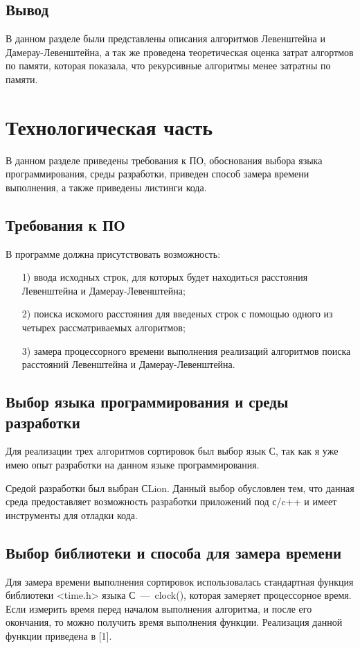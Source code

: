 \documentclass[12pt]{report}
\begin{document}
	\section*{Вывод}
	
	В данном разделе были представлены описания алгоритмов Левенштейна и Дамерау-Левенштейна, а так же проведена теоретическая оценка затрат алгортмов по памяти, которая показала, что рекурсивные алгоритмы менее затратны по памяти.
	
	\chapter{Технологическая часть}
	
	В данном разделе приведены требования к ПО, обоснования выбора языка программирования, среды разработки, приведен способ замера времени выполнения, а также приведены листинги кода.
	
	\section{Требования к ПО}
	
	В программе должна присутствовать возможность:
	
	\begin{enumerate}
		\item[1)] ввода исходных строк, для которых будет находиться расстояния Левенштейна и Дамерау-Левенштейна;
		\item[2)] поиска искомого расстояния для введеных строк с помощью одного из четырех рассматриваемых алгоритмов;
		\item[3)] замера процессорного времени выполнения реализаций алгоритмов поиска расстояний Левенштейна и Дамерау-Левенштейна.
	\end{enumerate}
	
	\section{Выбор языка программирования и среды разработки}
	
	Для реализации трех алгоритмов сортировок был выбор язык С, так как я уже имею опыт разработки на данном языке программирования.

	Средой разработки был выбран СLion. Данный выбор обусловлен тем, что данная среда предоставляет возможность разработки приложений под с/c++ и имеет инструменты для отладки кода. 
	
	\section{Выбор библиотеки и способа для замера времени}
		Для замера времени выполнения сортировок использовалась стандартная функция библиотеки <time.h> языка С~---~clock(), которая замеряет процессорное время. Если измерить время перед началом выполнения алгоритма, и после его окончания, то можно получить время выполнения функции. Реализация данной функции приведена в [1].
		
\end{document}
